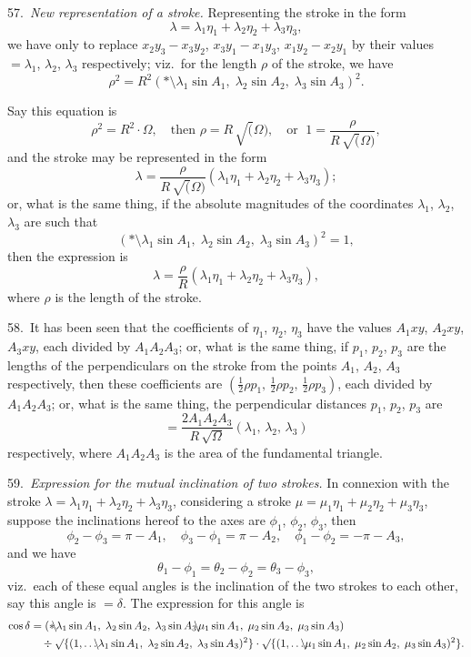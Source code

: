 \documentclass[12pt,a4paper]{article}
\theoremstyle{definition}
\begin{document}
57.\ \textit{New representation of a stroke.} Representing the stroke in the form
\[
\lambda = \lambda_1 \eta_1 + \lambda_2 \eta_2 + \lambda_3 \eta_3,
\]
we have only to replace $x_2 y_3 - x_3 y_2$, $x_3 y_1 - x_1 y_3$, $x_1 y_2 - x_2 y_1$
by their values $= \lambda_1$, $\lambda_2$, $\lambda_3$ respectively; viz.\ for the length $\rho$ of the stroke,
we have
\[
\rho^2 = R^2
(*\!\mathbin{\!\!\setminus\!\!}\lambda_1 \sin A_1,\;
\lambda_2 \sin A_2,\;
\lambda_3 \sin A_3)^2.
\]

Say this equation is
\[
\rho^2 = R^2 \cdot \Omega, \quad \text{then } \rho = R\, \surd(\Omega),
\quad \text{or }\; 1 = \frac{\rho}{R\, \surd(\Omega)},
\]
and the stroke may be represented in the form
\[
\lambda = \frac{\rho}{R\, \surd(\Omega)}
(\lambda_1 \eta_1 + \lambda_2 \eta_2 + \lambda_3 \eta_3);
\]
or, what is the same thing, if the absolute magnitudes of the coordinates
$\lambda_1$, $\lambda_2$, $\lambda_3$ are such that
\[
(*\!\mathbin{\!\!\setminus\!\!}\lambda_1 \sin A_1,\;
\lambda_2 \sin A_2,\;
\lambda_3 \sin A_3)^2 = 1,
\]
then the expression is
\[
\lambda = \frac{\rho}{R} (\lambda_1 \eta_1 + \lambda_2 \eta_2 + \lambda_3 \eta_3),
\]
where $\rho$ is the length of the stroke.

58.\ It has been seen that the coefficients of $\eta_1$, $\eta_2$, $\eta_3$ have the values
$A_1 xy$, $A_2 xy$, $A_3 xy$, each divided by $A_1 A_2 A_3$; or, what is the same thing,
if $p_1$, $p_2$, $p_3$ are the lengths of the perpendiculars on the stroke from the points
$A_1$, $A_2$, $A_3$ respectively, then these coefficients are
$(\tfrac12 \rho p_1,\, \tfrac12 \rho p_2,\, \tfrac12 \rho p_3)$, each divided by $A_1 A_2 A_3$;
or, what is the same thing, the perpendicular distances $p_1$, $p_2$, $p_3$ are
\[
= \frac{2 A_1 A_2 A_3}{R\, \surd\Omega}
(\lambda_1,\, \lambda_2,\, \lambda_3)
\]
respectively, where $A_1 A_2 A_3$ is the area of the fundamental triangle.

59.\ \textit{Expression for the mutual inclination of two strokes.} In connexion with the
stroke $\lambda = \lambda_1 \eta_1 + \lambda_2 \eta_2 + \lambda_3 \eta_3$, considering a stroke
$\mu = \mu_1 \eta_1 + \mu_2 \eta_2 + \mu_3 \eta_3$, suppose the inclinations hereof to the axes
are $\phi_1$, $\phi_2$, $\phi_3$, then
\[
\phi_2 - \phi_3 = \pi - A_1, \quad
\phi_3 - \phi_1 = \pi - A_2, \quad
\phi_1 - \phi_2 = -\pi - A_3,
\]
and we have
\[
\theta_1 - \phi_1 = \theta_2 - \phi_2 = \theta_3 - \phi_3,
\]
viz.\ each of these equal angles is the inclination of the two strokes to each other,
say this angle is $= \delta$. The expression for this angle is
\begin{align*}
\cos \delta &=
(*\!\mathbin{\!\!\setminus\!\!}\lambda_1 \sin A_1,\;
\lambda_2 \sin A_2,\;
\lambda_3 \sin A_3 \!\mathbin{\!\!\setminus\!\!}
\mu_1 \sin A_1,\;
\mu_2 \sin A_2,\;
\mu_3 \sin A_3)\\
& \quad \div
\surd\{(1, \ldots \!\mathbin{\!\!\setminus\!\!}
\lambda_1 \sin A_1,\;
\lambda_2 \sin A_2,\;
\lambda_3 \sin A_3)^2\} \cdot
\surd\{(1, \ldots \!\mathbin{\!\!\setminus\!\!}
\mu_1 \sin A_1,\;
\mu_2 \sin A_2,\;
\mu_3 \sin A_3)^2\}.
\end{align*}
\end{document}
